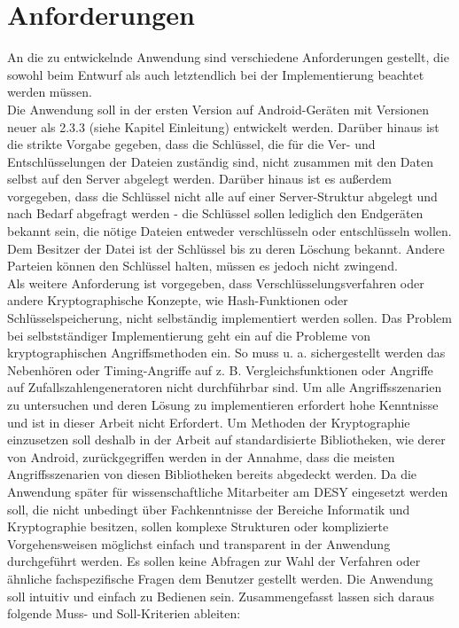 \documentclass[10pt, a4paper,headsepline]{scrreprt}
\begin{document}
\section{Anforderungen}
An die zu entwickelnde Anwendung sind verschiedene Anforderungen gestellt, die sowohl beim Entwurf als auch letztendlich bei der Implementierung beachtet werden müssen. \\
Die Anwendung soll in der ersten Version auf Android-Geräten mit Versionen neuer als 2.3.3 (siehe Kapitel Einleitung) entwickelt werden. Darüber hinaus ist die strikte Vorgabe gegeben, dass die Schlüssel, die für die Ver- und Entschlüsselungen der Dateien zuständig sind, nicht zusammen mit den Daten selbst auf den Server abgelegt werden. Darüber hinaus ist es außerdem vorgegeben, dass die Schlüssel nicht alle auf einer Server-Struktur abgelegt und nach Bedarf abgefragt werden - die Schlüssel sollen lediglich den Endgeräten bekannt sein, die nötige Dateien entweder verschlüsseln oder entschlüsseln wollen. Dem Besitzer der Datei ist der Schlüssel bis zu deren Löschung bekannt. Andere Parteien können den Schlüssel halten, müssen es jedoch nicht zwingend. \\
Als weitere Anforderung ist vorgegeben, dass Verschlüsselungsverfahren oder andere Kryptographische Konzepte, wie Hash-Funktionen oder Schlüsselspeicherung, nicht selbständig implementiert werden sollen. Das Problem bei selbstständiger Implementierung geht ein auf die Probleme von kryptographischen Angriffsmethoden ein. So muss u. a. sichergestellt werden das Nebenhören oder Timing-Angriffe auf z. B. Vergleichsfunktionen oder Angriffe auf Zufallszahlengeneratoren nicht durchführbar sind. Um alle Angriffsszenarien zu untersuchen und deren Lösung zu implementieren erfordert hohe Kenntnisse und ist in dieser Arbeit nicht Erfordert. Um Methoden der Kryptographie einzusetzen soll deshalb in der Arbeit auf standardisierte Bibliotheken, wie derer von Android, zurückgegriffen werden in der Annahme, dass die meisten Angriffsszenarien von diesen Bibliotheken bereits abgedeckt werden. Da die Anwendung später für wissenschaftliche Mitarbeiter am DESY eingesetzt werden soll, die nicht unbedingt über Fachkenntnisse der Bereiche Informatik und Kryptographie besitzen, sollen komplexe Strukturen oder komplizierte Vorgehensweisen möglichst einfach und transparent in der Anwendung durchgeführt werden. Es sollen keine Abfragen zur Wahl der Verfahren oder ähnliche fachspezifische Fragen dem Benutzer gestellt werden. Die Anwendung soll intuitiv und einfach zu Bedienen sein. Zusammengefasst lassen sich daraus folgende Muss- und Soll-Kriterien ableiten: \\ \\ \\
\end{document}

